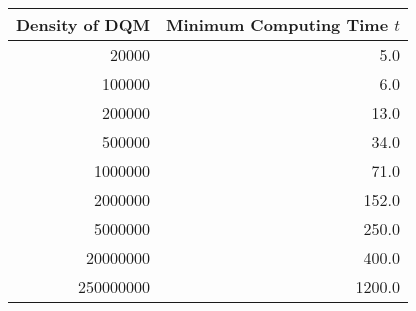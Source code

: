 \begin{tabular}{| r | r |}
  \hline
  Density of DQM & Minimum Computing Time $t$ \\
  \hline \hline
  20000 & 5.0 \\
  \hline
  100000 & 6.0 \\
  \hline
  200000 & 13.0 \\
  \hline
  500000 & 34.0 \\
  \hline
  1000000 & 71.0 \\
  \hline
  2000000 & 152.0 \\
  \hline
  5000000 & 250.0 \\
  \hline
  20000000 & 400.0 \\
  \hline
  250000000 & 1200.0 \\
  \hline
\end{tabular}